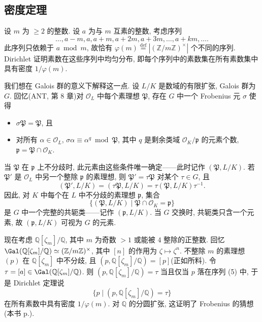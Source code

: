 \setcounter{theorem}{7}

\subsection*{密度定理}

设 $m$ 为 $\geq 2$ 的整数. 设 $a$ 为与 $m$ 互素的整数, 考虑序列
\begin{equation*}
\ldots, a-m, a, a+m, a+2m, a+3m, \ldots, a+km, \ldots.\tag{5}
\end{equation*}
此序列只依赖于 $a \bmod m$, 故恰有 $\varphi(m) \overset{\mathrm{def}}{=} |(\mathbb{Z}/m\mathbb{Z})^{\times}|$ 个不同的序列. Dirichlet 证明素数在这些序列中均匀分布, 即每个序列中的素数集在所有素数集中具有密度 $1/\varphi(m)$.

我们想在 Galois 群的意义下解释这一点. 设 $L/K$ 是数域的有限扩张, Galois 群为 $G$. 回忆(ANT, 第 8 章)对 $\mathcal{O}_{L}$ 中每个素理想 $\mathfrak{P}$, 存在 $G$ 中一个 Frobenius 元 $\sigma$ 使得
\begin{itemize}
\item $\sigma\mathfrak{P} = \mathfrak{P}$, 且
\item 对所有 $\alpha \in \mathcal{O}_{L}$, $\sigma\alpha \equiv \alpha^{q} \bmod \mathfrak{P}$, 其中 $q$ 是剩余类域 $\mathcal{O}_{K}/\mathfrak{p}$ 的元素个数, $\mathfrak{p} = \mathfrak{P} \cap \mathcal{O}_{K}$.
\end{itemize}
当 $\mathfrak{P}$ 在 $\mathfrak{p}$ 上不分歧时, 此元素由这些条件唯一确定——此时记作 $(\mathfrak{P}, L/K)$. 若 $\mathfrak{P}'$ 是 $\mathcal{O}_{L}$ 中另一个整除 $\mathfrak{p}$ 的素理想, 则 $\mathfrak{P}' = \tau\mathfrak{P}$ 对某个 $\tau \in G$, 且
\[
(\mathfrak{P}', L/K) = (\tau\mathfrak{P}, L/K) = \tau(\mathfrak{P}, L/K)\tau^{-1}.
\]
因此, 对 $K$ 中每个在 $L$ 中不分歧的素理想 $\mathfrak{p}$, 集合
\[
\{(\mathfrak{P}, L/K) \mid \mathfrak{P} \cap \mathcal{O}_{K} = \mathfrak{p}\}
\]
是 $G$ 中一个完整的共轭类——记作 $(\mathfrak{p}, L/K)$. 当 $G$ 交换时, 共轭类只含一个元素, 故 $(\mathfrak{p}, L/K)$ 可视为 $G$ 的元素.

现在考虑 $\mathbb{Q}[\zeta_{m}]/\mathbb{Q}$, 其中 $m$ 为奇数 $>1$ 或能被 $4$ 整除的正整数. 回忆 $\Gal(\mathbb{Q}[\zeta_{m}]/\mathbb{Q}) \simeq (\mathbb{Z}/m\mathbb{Z})^{\times}$, 其中 $[n]$ 的作用为 $\zeta \mapsto \zeta^{n}$. 不整除 $m$ 的素理想 $(p)$ 在 $\mathbb{Q}[\zeta_{m}]$ 中不分歧, 且 $(p, \mathbb{Q}[\zeta_{m}]/\mathbb{Q}) = [p]$(正如所料). 令 $\tau = [a] \in \Gal(\mathbb{Q}[\zeta_{m}]/\mathbb{Q})$. 则 $(p, \mathbb{Q}[\zeta_{m}]/\mathbb{Q}) = \tau$ 当且仅当 $p$ 落在序列 (5) 中, 于是 Dirichlet 定理说
\[
\{p \mid (p, \mathbb{Q}[\zeta_{m}]/\mathbb{Q}) = \tau\}
\]
在所有素数中具有密度 $1/\varphi(m)$. 对 $\mathbb{Q}$ 的分圆扩张, 这证明了 Frobenius 的猜想(本书 p.\pageref{pg:orig3}).

